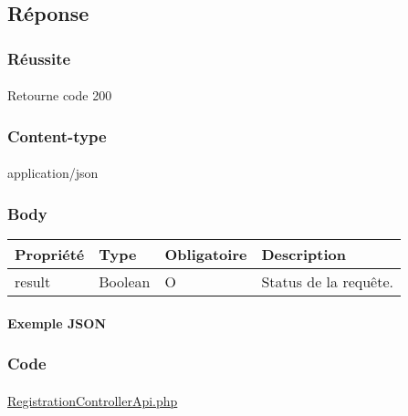 			\paragraph{}
			

\subsection{Réponse}
	\subsubsection{Réussite}
		\paragraph{}
			Retourne code 200
			
	\subsubsection{Content-type}
		\paragraph{}
			application/json
	
	\subsubsection{Body}
		\begin{center}
			\begin{tabularx}{\textwidth}{| T{0.2122\textwidth} | S{0.22\textwidth} | S{0.15\textwidth} | S{0.3\textwidth} |}
				\hline
				Propriété & Type & Obligatoire & Description \\
				\hline
				result & Boolean & O & Status de la requête. \\
				\hline
			\end{tabularx}
		\end{center}
		
		\paragraph{Exemple JSON}
			\paragraph{}
			
			
			
	\subsubsection{Code}
		\paragraph{}
			\href{https://github.com/victorsmits/Aquabike/blob/master/backend/src/Controller/API/RegistrationControllerApi.php}{RegistrationControllerApi.php}